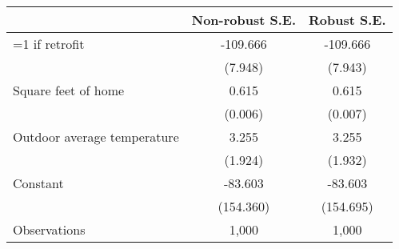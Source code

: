 \begin{tabular}{l*{2}{c}}
\hline\hline
                    &\multicolumn{1}{c}{Non-robust S.E.}&\multicolumn{1}{c}{Robust S.E.}\\
\hline
=1 if retrofit      &    -109.666&    -109.666\\
                    &     (7.948)&     (7.943)\\
Square feet of home &       0.615&       0.615\\
                    &     (0.006)&     (0.007)\\
Outdoor average temperature&       3.255&       3.255\\
                    &     (1.924)&     (1.932)\\
Constant            &     -83.603&     -83.603\\
                    &   (154.360)&   (154.695)\\
\hline
Observations        &       1,000&       1,000\\
\hline\hline
\end{tabular}
